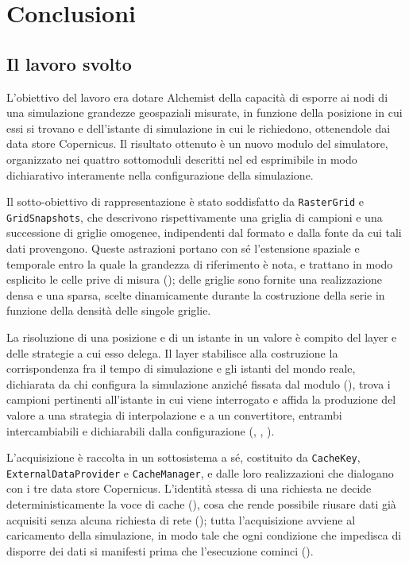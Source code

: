 \chapter{Conclusioni}
\label{chap:conclusioni}

\section{Il lavoro svolto}
\label{sec:riepilogo}

L'obiettivo del lavoro era dotare Alchemist della capacità
di esporre ai nodi di una simulazione grandezze geospaziali misurate,
in funzione della posizione in cui essi si trovano e dell'istante di
simulazione in cui le richiedono, ottenendole dai data store Copernicus.
Il risultato ottenuto è un nuovo modulo del simulatore, organizzato
nei quattro sottomoduli descritti nel  ed esprimibile
in modo dichiarativo interamente nella configurazione della simulazione.

Il sotto-obiettivo di rappresentazione è stato soddisfatto da \texttt{RasterGrid}
e \texttt{GridSnapshots}, che descrivono rispettivamente una griglia di campioni
e una successione di griglie omogenee, indipendenti dal formato e dalla fonte
da cui tali dati provengono. Queste astrazioni portano con sé l'estensione
spaziale e temporale entro la quale la grandezza di riferimento è nota, e trattano
in modo esplicito le celle prive di misura (); delle griglie sono fornite
una realizzazione densa e una sparsa, scelte dinamicamente durante la costruzione
della serie in funzione della densità delle singole griglie.

La risoluzione di una posizione e di un istante in un valore è compito
del layer e delle strategie
a cui esso delega. Il layer stabilisce alla costruzione la corrispondenza fra
il tempo di simulazione e gli istanti del mondo reale, dichiarata da chi
configura la simulazione anziché fissata dal modulo (),
trova i campioni pertinenti all'istante in cui viene interrogato e affida
la produzione del valore a una strategia di interpolazione e a un convertitore,
entrambi intercambiabili e dichiarabili dalla configurazione (, , ).

L'acquisizione è raccolta in un sottosistema a sé,
costituito da \texttt{CacheKey}, \texttt{ExternalDataProvider} e \texttt{CacheManager},
e dalle loro realizzazioni che dialogano con i tre data store Copernicus.
L'identità stessa di una richiesta ne decide deterministicamente la voce
di cache (), cosa che rende possibile riusare dati già acquisiti
senza alcuna richiesta di rete (); tutta l'acquisizione avviene
al caricamento della simulazione, in modo tale che ogni condizione che
impedisca di disporre dei dati si manifesti prima che l'esecuzione cominci ().

